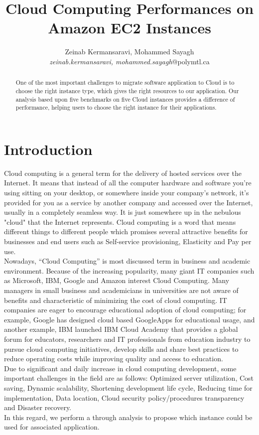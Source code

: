 \documentclass[10pt, conference]{IEEEtran}
\title{Cloud Computing Performances on Amazon EC2 Instances}
\author{Zeinab Kermansaravi, Mohammed Sayagh
    \\
    \emph{zeinab.kermansaravi, mohammed.sayagh}@polymtl.ca}
\begin{document}
\maketitle

\begin{abstract}
One of the most important challenges to migrate software application to Cloud is to choose the right instance type, which gives the right resources to our application. Our analysis based upon five benchmarks on five Cloud instances provides a difference of performance, helping users to choose the right instance for their applications. 
\end{abstract}

\section{Introduction}
\label{sec:introduction}


\indent Cloud computing is a general term for the delivery of hosted services over the Internet. It means that instead of all the computer hardware and software you're using sitting on your desktop, or somewhere inside your company's network, it's provided for you as a service by another company and accessed over the Internet, usually in a completely seamless way. It is just somewhere up in the nebulous "cloud" that the Internet represents. Cloud computing is a word that means different things to different people which promises several attractive benefits for businesses and end users such as Self-service provisioning, Elasticity and Pay per use.\\
\indent Nowadays, “Cloud Computing” is most discussed term in business and academic environment. Because of the increasing popularity, many giant IT companies such as Microsoft, IBM, Google and Amazon interest Cloud Computing. Many managers in small business and academicians in universities are not aware of benefits and characteristic of minimizing the cost of cloud computing. IT companies are eager to encourage educational adoption of cloud computing; for example, Google has designed cloud based GoogleApps for educational usage, and another example, IBM launched IBM Cloud Academy that provides a global forum for educators, researchers and IT professionals from education industry to pursue cloud computing initiatives, develop skills and share best practices to reduce operating costs while improving quality and access to education.\\
\indent Due to significant and daily increase in cloud computing development, some important challenges in the field are as follows: Optimized server utilization, Cost saving, Dynamic scalability, Shortening development life cycle, Reducing time for implementation, Data location, Cloud security policy/procedures transparency and Disaster recovery.\\
\indent In this regard, we perform a through analysis to propose which instance could be used for associated application.
\end{document}
